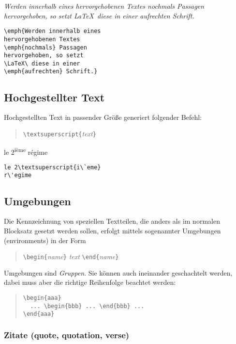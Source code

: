 \exa 
\emph{Werden innerhalb eines hervorgehobenen Textes
\emph{nochmals} Passagen hervorgehoben, so setzt \LaTeX\ diese in
einer \emph{aufrechten} Schrift.}
\exb
\begin{verbatim}
\emph{Werden innerhalb eines 
hervorgehobenen Textes 
\emph{nochmals} Passagen
hervorgehoben, so setzt
\LaTeX\ diese in einer 
\emph{aufrechten} Schrift.}
\end{verbatim}
\exc


\subsection{Hochgestellter Text}
Hochgestellten Text in passender Größe generiert folgender Befehl:
\begin{quote}
\verb|\textsuperscript{|\textit{text}\verb|}|
\end{quote}
\exa
le 2\textsuperscript{i\`eme} r\'egime
\exb
\begin{verbatim}
le 2\textsuperscript{i\`eme}
r\'egime
\end{verbatim}
\exc




\subsection{Umgebungen} \label{env}

Die Kennzeichnung von speziellen Textteilen, die anders als im
normalen Blocksatz gesetzt werden sollen, erfolgt mittels
sogenannter Umgebungen (environments) in der Form
\begin{quote}
\verb|\begin{|\textit{name}\verb|}|\quad
   \textit{text}\quad
   \verb|\end{|\textit{name}\verb|}|
\end{quote}
Umgebungen sind \emph{Gruppen}.
Sie können auch ineinander geschachtelt werden, dabei muss aber
die richtige Reihenfolge beachtet werden:
\begin{quote}
\verb|\begin{aaa}|\\
\verb|  ... \begin{bbb} ... \end{bbb} ... |\\
\verb|\end{aaa}|
\end{quote}


\subsubsection{Zitate (quote, quotation, verse)}
 
